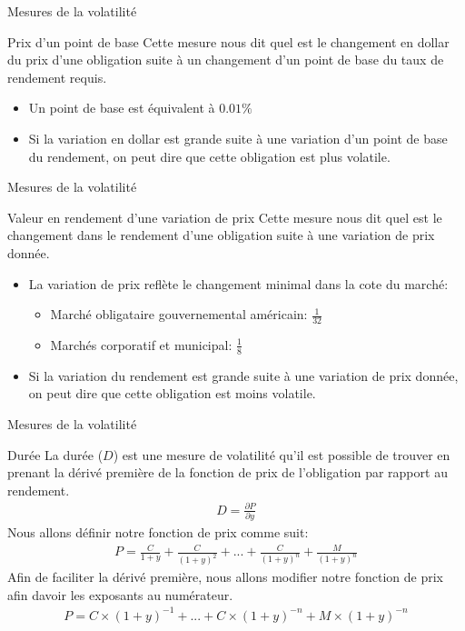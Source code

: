 \documentclass[11pt]{beamer}
\begin{document}
\begin{frame}{Mesures de la volatilité}
\begin{block}{Prix d’un point de base}
Cette mesure nous dit quel est le changement en dollar du prix d'une obligation suite à un changement d'un point de base du taux de rendement requis.
\begin{itemize}
\item Un point de base est équivalent à $0.01\%$
\item Si la variation en dollar est grande suite à une variation d'un point de base du rendement, on peut dire que cette obligation est plus volatile.
\end{itemize}
\end{block}
\end{frame}


\begin{frame}{Mesures de la volatilité}
\begin{block}{Valeur en rendement d’une variation de prix}
Cette mesure nous dit quel est le changement dans le rendement d'une obligation suite à une variation de prix donnée.  
\begin{itemize}
\item La variation de prix reflète le changement minimal dans la cote du marché: 
\begin{itemize}
\item Marché obligataire gouvernemental américain: $\frac{1}{32}$
\item Marchés corporatif et municipal: $\frac{1}{8}$
\end{itemize}
\item Si la variation du rendement est grande suite à une variation de prix donnée, on peut dire que cette obligation est moins volatile.
\end{itemize}
\end{block}
\end{frame}




\begin{frame}{Mesures de la volatilité}
\begin{block}{Durée}
La durée ($D$) est une mesure de volatilité qu'il est possible de trouver en prenant la dérivé première de  la fonction de prix de l'obligation par rapport au rendement. 
\begin{align*}
D=\frac{\partial P}{\partial y}
\end{align*}
Nous allons définir notre fonction de prix comme suit:
\begin{align*}
P=\frac{C}{1+y}+\frac{C}{(1+y)^2}+...+\frac{C}{(1+y)^n}+\frac{M}{(1+y)^n}
\end{align*}
Afin de faciliter la dérivé première, nous allons modifier notre fonction de prix afin davoir les exposants au numérateur.
\begin{align*}
P=C \times (1+y)^{-1}+...+C \times (1+y)^{-n}+M \times (1+y)^{-n}
\end{align*}
\end{block}
\end{frame}
\end{document}
